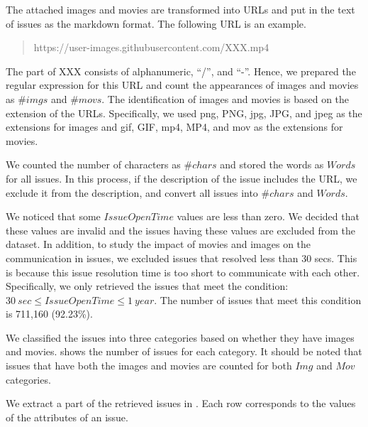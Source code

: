 The attached images and movies are transformed into 
URLs and put in the text of issues as the markdown format. 
The following URL is an example.

\begin{quote}
	https://user-images.githubusercontent.com/XXX.mp4
\end{quote}

\noindent{}
The part of XXX consists of alphanumeric, ``/'', and ``-''.
Hence, we prepared the regular expression for this URL and 
count the appearances of images and movies as $\#imgs$ and $\#movs$. 
The identification of images and movies is based on the extension of 
the URLs. 
Specifically, we used png, PNG, jpg, JPG, and jpeg as 
the extensions for images and 
gif, GIF, mp4, MP4, and mov as the extensions for movies.

We counted the number of characters as $\#chars$ and 
stored the words as $Words$ for all issues. 
In this process, if the description of the issue 
includes the URL, we exclude it from the description, 
and convert all issues into $\#chars$ and $Words$.

We noticed that some $IssueOpenTime$ values are less than zero. 
We decided that these values are invalid and the issues having 
these values are excluded from the dataset. 
In addition, to study the impact of movies and images on 
the communication in issues, 
we excluded issues that resolved less than 30 secs. 
This is because this issue resolution time is too short 
to communicate with each other. 
Specifically, we only retrieved the issues that meet 
the condition: $30\ sec \leq IssueOpenTime \leq 1\ year$.
The number of issues that meet this condition is 711,160 (92.23\%).



We classified the issues into three categories based on 
whether they have images and movies. 
 shows the number of issues for each category. 
It should be noted that issues that have both 
the images and movies are counted for both 
$Img$ and $Mov$ categories. 



We extract a part of the retrieved issues in . 
Each row corresponds to the values of the attributes of an issue. 
